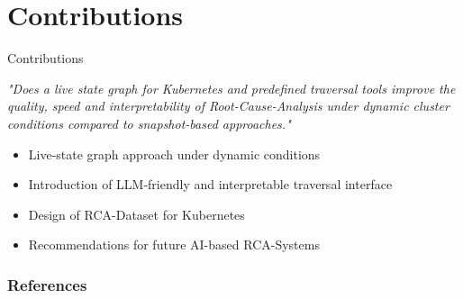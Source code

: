 \documentclass[aspectratio=169]{beamer}
\begin{document}
\section{Contributions}
\begin{frame}[fragile]{Contributions}

\textit{"Does a live state graph for Kubernetes and predefined traversal tools improve the quality, speed and interpretability of Root-Cause-Analysis under dynamic cluster conditions compared to snapshot-based approaches."}

\vspace{30pt}

\begin{itemize}
  \item Live-state graph approach under dynamic conditions
  \item Introduction of LLM-friendly and interpretable traversal interface
  \item Design of RCA-Dataset for Kubernetes
  \item Recommendations for future AI-based RCA-Systems
\end{itemize}

\end{frame}

\begin{frame}[allowframebreaks]
        \frametitle{References}
        
        
\end{frame}
\end{document}
